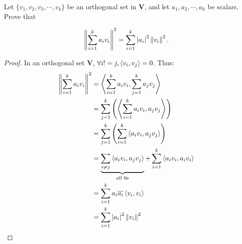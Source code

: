 \begin{homeworkProblem}

Let $\{v_1, v_2, v_3, \cdots, v_k\}$ be an orthogonal set in $\mathbf{V}$, and let
$a_1, a_2, \cdots, a_k$ be scalars. Prove that

\[
    \norm{\sum_{i=1}^{k}a_iv_i}^2 = \sum_{i=1}^k \left|a_i\right|^2 \norm{v_i}^2.
\]

\solution

\begin{proof}

In an orthogonal set $\mathbf{V}$, $\forall i != j, \innerprod[v_i]{v_j} = 0$. Thus:
\[
\begin{aligned}
\norm{\sum_{i=1}^{k}a_iv_i}^2 &= \innerprod[\sum_{i=1}^{k}a_iv_i]{\sum_{j=1}^{k}a_jv_j} \\
&= \sum_{j=1}^{k}\left(\innerprod[\sum_{i=1}^{k}a_iv_i]{a_jv_j}\right)\\
&= \sum_{j=1}^{k}\left(\sum_{i=1}^{k}\innerprod[a_iv_i]{a_jv_j}\right)\\
&= \underbrace{\sum_{i \neq j}\innerprod[a_iv_i]{a_jv_j}}_{\text{all 0s}}
   + \sum_{i=1}^{k} \innerprod[a_iv_i]{a_iv_i} \\
&= \sum_{i=1}^{k} a_i \overline{a_i}\innerprod[v_i]{v_i}\\
&= \sum_{i=1}^k \left|a_i\right|^2 \norm{v_i}^2
\end{aligned}
\]


\end{proof}

\end{homeworkProblem}
